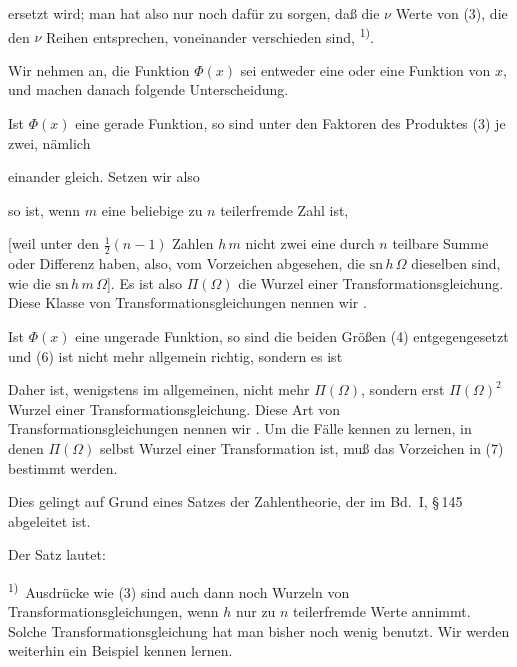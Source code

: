 ersetzt wird; man hat also nur noch dafür zu sorgen, daß die $\nu$ Werte von (3), die den $\nu$ Reihen entsprechen, voneinander verschieden sind, \textsuperscript{1)}.

Wir nehmen an, die Funktion $\Phi(x)$ sei entweder eine  oder eine  Funktion von $x$, und machen danach folgende Unterscheidung.

Ist $\Phi(x)$ eine gerade Funktion, so sind unter den Faktoren des Produktes (3) je zwei, nämlich


einander gleich. Setzen wir also


so ist, wenn $m$ eine beliebige zu $n$ teilerfremde Zahl ist,


[weil unter den $\frac{1}{2}(n-1)$ Zahlen $h\,m$ nicht zwei eine durch $n$ teilbare Summe oder Differenz haben, also, vom Vorzeichen abgesehen, die $\mathrm{sn}\,h\,\Omega$ dieselben sind, wie die $\mathrm{sn}\,h\,m\,\Omega$]. Es ist also $\Pi(\Omega)$ die Wurzel einer Transformationsgleichung. Diese Klasse von Transformationsgleichungen nennen wir .

Ist $\Phi(x)$ eine ungerade Funktion, so sind die beiden Größen (4) entgegengesetzt und (6) ist nicht mehr allgemein richtig, sondern es ist


Daher ist, wenigstens im allgemeinen, nicht mehr $\Pi(\Omega)$, sondern erst $\Pi(\Omega)^2$ Wurzel einer Transformationsgleichung. Diese Art von Transformationsgleichungen nennen wir . Um die Fälle kennen zu lernen, in denen $\Pi(\Omega)$ selbst Wurzel einer Transformation ist, muß das Vorzeichen in (7) bestimmt werden.

Dies gelingt auf Grund eines Satzes der Zahlentheorie, der im Bd.\ I, \S\,145 abgeleitet ist.

Der Satz lautet:

\textsuperscript{1)}~Ausdrücke wie (3) sind auch dann noch Wurzeln von Transformationsgleichungen, wenn $h$ nur zu $n$ teilerfremde Werte annimmt. Solche Transformationsgleichung %
hat man bisher noch wenig benutzt. Wir werden weiterhin ein Beispiel kennen lernen.
